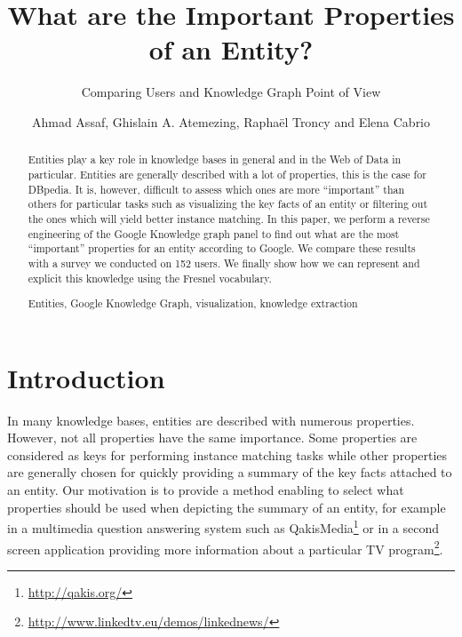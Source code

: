 \documentclass[runningheads,a4paper]{llncs}
\newcommand{\keywords}[1]{\par\addvspace\baselineskip
\noindent\keywordname\enspace\ignorespaces#1}
\begin{document}
\title{What are the Important Properties of an Entity?}
\subtitle{Comparing Users and Knowledge Graph Point of View}

\author{Ahmad Assaf, Ghislain A. Atemezing, Rapha\"{e}l Troncy and Elena Cabrio }



\maketitle


\begin{abstract}
Entities play a key role in knowledge bases in general and in the Web of Data in particular. Entities are generally described with a lot of properties, this is the case for DBpedia. It is, however, difficult to assess which ones are more ``important'' than others for particular tasks such as visualizing the key facts of an entity or filtering out the ones which will yield better instance matching. In this paper, we perform a reverse engineering of the Google Knowledge graph panel to find out what are the most ``important'' properties for an entity according to Google. We compare these results with a survey we conducted on 152 users. We finally show how we can represent and explicit this knowledge using the Fresnel vocabulary.
\keywords{Entities, Google Knowledge Graph, visualization, knowledge extraction}
\end{abstract}


\section{Introduction}
\label{sec:introduction}
In many knowledge bases, entities are described with numerous properties. However, not all properties have the same importance. Some properties are considered as keys for performing instance matching tasks while other properties are generally chosen for quickly providing a summary of the key facts attached to an entity. Our motivation is to provide a method enabling to select what properties should be used when depicting the summary of an entity, for example in a multimedia question answering system such as QakisMedia\footnote{\url{http://qakis.org/}} or in a second screen application providing more information about a particular TV program\footnote{\url{http://www.linkedtv.eu/demos/linkednews/}}.
\end{document}
